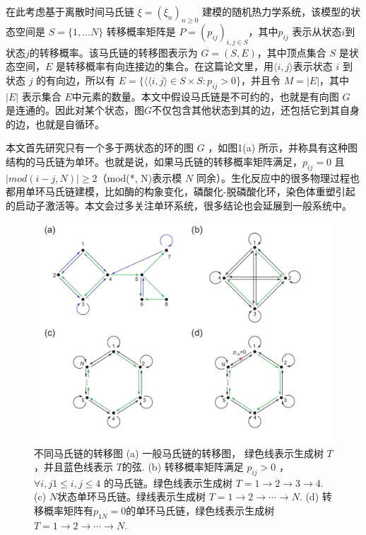 
在此考虑基于离散时间马氏链 $\xi = (\xi_n)_{n \ge 0}$ 建模的随机热力学系统，该模型的状态空间是 $S = \{1, \dots N\}$ 转移概率矩阵是 $P=(p_{ij})_{i,j \in S}$，其中$p_{ij}$ 表示从状态$i$到状态$j$的转移概率。该马氏链的转移图表示为 $G=(S, E)$，其中顶点集合 $S$ 是状态空间，$E$ 是转移概率有向连接边的集合。在这篇论文里，用$\langle i, j\rangle$表示状态 $i$ 到状态 $j$ 的有向边，所以有 $E = \{\langle \langle i, j\rangle \in S \times S: p_{ij}>0\}$，并且令 $M =|E|$，其中 $|E|$ 表示集合 $E$中元素的数量。本文中假设马氏链是不可约的，也就是有向图 $G$ 是连通的。因此对某个状态，图$G$不仅包含其他状态到其的边，还包括它到其自身的边，也就是自循环。

本文首先研究只有一个多于两状态的环的图 $G$ ，如图1(a) 所示，并称具有这种图结构的马氏链为单环。也就是说，如果马氏链的转移概率矩阵满足，$p_{ij}=0$ 且 $|mod(i-j, N)| \ge 2$（mod(*, N)表示模 $N$ 同余）。生化反应中的很多物理过程也都用单环马氏链建模，比如酶的构象变化，磷酸化-脱磷酸化环，染色体重塑引起的启动子激活等。本文会过多关注单环系统，很多结论也会延展到一般系统中。

\begin{figure}[h]
\centering
\includegraphics[scale=0.7]{chart/transitiongraph.pdf}
\caption{不同马氏链的转移图 (a) 一般马氏链的转移图， 绿色线表示生成树 $T$ ，并且蓝色线表示 $T$的弦. (b) 转移概率矩阵满足 $p_{ij}>0$ ，$\forall i, j 1\le i,j\le 4$ 的马氏链。绿色线表示生成树 $T=1\to 2\to 3\to 4$. (c) $N$状态单环马氏链。绿线表示生成树 $T=1\to 2\to \cdots\to N$. (d) 转移概率矩阵有$p_{1N}=0$的单环马氏链，绿色线表示生成树 $T=1\to 2\to \cdots\to N$.}\label{figure:transitiongraph}
\end{figure}


